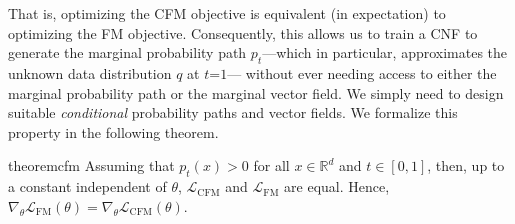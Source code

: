 \documentclass{article}
\newcommand{\yl}[1]{{\color{magenta}{\bf[Yaron:} #1{\bf]}}}
\newcommand{\ricky}[1]{{\color{orange}{\bf[Ricky:} #1{\bf]}}}
\newcommand{\Real}{\mathbb R}
\newcommand{\CFM}{\scriptscriptstyle \text{CFM}}
\newcommand{\FM}{\scriptscriptstyle \text{FM}}
\def\gL{{\mathcal{L}}}
\begin{document}
That is, optimizing the CFM objective is equivalent (in expectation) to optimizing the FM objective. Consequently, this allows us to train a CNF to generate the marginal probability path $p_t$---which in particular, approximates the unknown data distribution $q$ at $t$=$1$---
without ever needing access to either the marginal probability path or the marginal vector field. We simply need to design suitable \emph{conditional} probability paths and vector fields.
%
We formalize this property in the following theorem.
\begin{restatable}{theorem}{cfm}\label{thm:grad_VR_equals_CVR}
Assuming that $p_t(x)>0$ for all $x\in\Real^d$ and $t\in [0,1]$, then, up to a constant independent of $\theta$, $\gL_{\CFM}$ and $\gL_{\FM}$ are equal. Hence,  
$\nabla_\theta \mathcal{L}_{\FM}(\theta) = \nabla_\theta \mathcal{L}_{\CFM}(\theta)$.
\end{restatable}



\end{document}

